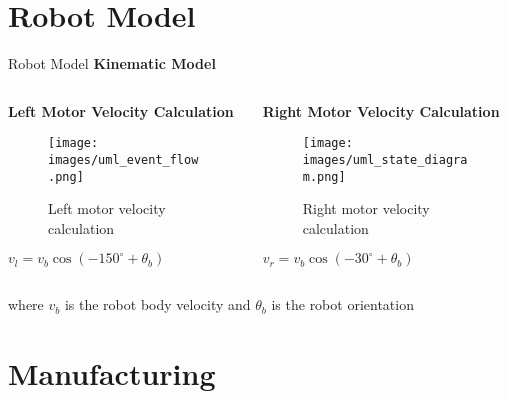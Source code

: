 \documentclass[aspectratio=169]{beamer}
\newcommand{\reducefontsize}{\fontsize{7}{9}\selectfont}
\begin{document}
\section{Robot Model}

\begin{frame}{Robot Model}
	\large{\textbf{Kinematic Model}}
	\vspace{0.3cm}

	\begin{columns}
		\begin{column}{0.5\textwidth}
      {\reducefontsize%
			\textbf{Left Motor Velocity Calculation}
			\begin{figure}
				\centering
				\texttt{[image: images/uml\_event\_flow.png]}
				\caption{Left motor velocity calculation}
			\end{figure}
			\begin{center}
				$v_l = v_b \cos(-150^{\circ} + \theta_b)$
			\end{center}
      }
		\end{column}
		\begin{column}{0.5\textwidth}
      {\reducefontsize%
			\textbf{Right Motor Velocity Calculation}
			\begin{figure}
				\centering
				\texttt{[image: images/uml\_state\_diagram.png]}
				\caption{Right motor velocity calculation}
			\end{figure}
			\begin{center}
				$v_r = v_b \cos(-30^{\circ} + \theta_b)$
			\end{center}
      }
		\end{column}
	\end{columns}

	\vspace{0.5cm}
	\begin{center}
	\end{center}

	\vspace{0.2cm}
	\small{where $v_b$ is the robot body velocity and $\theta_b$ is the robot orientation}
\end{frame}

\section{Manufacturing}
\end{document}

